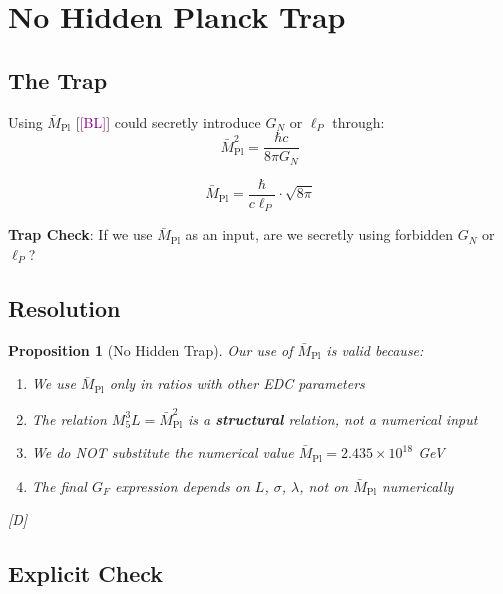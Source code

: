 \documentclass[11pt,a4paper]{article}
\newtheorem{proposition}[theorem]{Proposition}
\newcommand{\tagD}{\textcolor{blue!70!black}{[D]}}
\newcommand{\tagBL}{\textcolor{purple}{[BL]}}
\begin{document}
\section{No Hidden Planck Trap}

\subsection{The Trap}

Using $\bar{M}_{\text{Pl}}$ [\tagBL] could secretly introduce $G_N$ or $\ell_P$ through:
\begin{equation}
\label{eq:trap-GN}
\bar{M}_{\text{Pl}}^2 = \frac{\hbar c}{8\pi G_N}
\end{equation}

\begin{equation}
\label{eq:trap-lP}
\bar{M}_{\text{Pl}} = \frac{\hbar}{c \ell_P} \cdot \sqrt{8\pi}
\end{equation}

\begin{trapbox}
\textbf{Trap Check}: If we use $\bar{M}_{\text{Pl}}$ as an input, are we secretly
using forbidden $G_N$ or $\ell_P$?
\end{trapbox}

\subsection{Resolution}

\begin{proposition}[No Hidden Trap]
\label{prop:no-trap}
Our use of $\bar{M}_{\text{Pl}}$ is valid because:
\begin{enumerate}
    \item We use $\bar{M}_{\text{Pl}}$ only in ratios with other EDC parameters
    \item The relation $M_5^3 L = \bar{M}_{\text{Pl}}^2$ is a \textbf{structural} relation,
    not a numerical input
    \item We do NOT substitute the numerical value $\bar{M}_{\text{Pl}} = 2.435 \times 10^{18}$ GeV
    \item The final $G_F$ expression depends on $L$, $\sigma$, $\lambda$, not on $\bar{M}_{\text{Pl}}$ numerically
\end{enumerate}
\tagD
\end{proposition}

\subsection{Explicit Check}
\end{document}
